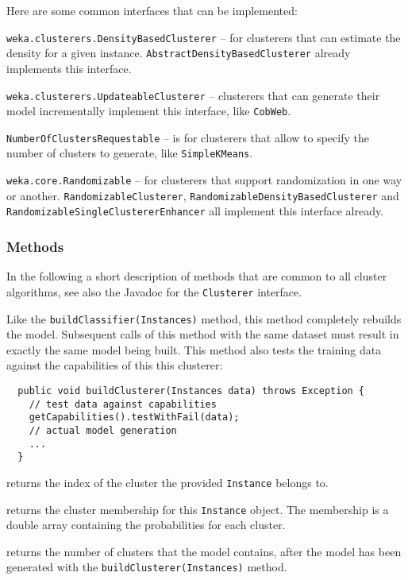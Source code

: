 \noindent Here are some common interfaces that can be implemented:
\begin{tight_itemize}
  \item \texttt{weka.clusterers.DensityBasedClusterer} -- for clusterers that
can estimate the density for a given instance.
\texttt{AbstractDensityBasedClusterer} already implements this interface.
  \item \texttt{weka.clusterers.UpdateableClusterer} -- clusterers that can
generate their model incrementally implement this interface, like
\texttt{CobWeb}.
  \item \texttt{NumberOfClustersRequestable} -- is for clusterers that allow to
specify the number of clusters to generate, like \texttt{SimpleKMeans}.
  \item \texttt{weka.core.Randomizable} -- for clusterers that support
randomization in one way or another. \texttt{RandomizableClusterer},
\texttt{RandomizableDensityBasedClusterer} and
\texttt{RandomizableSingleClustererEnhancer} all implement this interface
already.
\end{tight_itemize}

\subsubsection*{Methods}
In the following a short description of methods that are common to all cluster
algorithms, see also the Javadoc for the \texttt{Clusterer} interface.

Like the \texttt{buildClassifier(Instances)} method, this method completely
rebuilds the model. Subsequent calls of this method with the same dataset must
result in exactly the same model being built. This method also tests the
training data against the capabilities of this this clusterer:
\begin{verbatim}
  public void buildClusterer(Instances data) throws Exception {
    // test data against capabilities
    getCapabilities().testWithFail(data);
    // actual model generation
    ...
  }
\end{verbatim}

returns the index of the cluster the provided \texttt{Instance} belongs to.

returns the cluster membership for this \texttt{Instance} object. The
membership is a double array containing the probabilities for each cluster.

returns the number of clusters that the model contains, after the model has
been generated with the \texttt{buildClusterer(Instances)} method.

